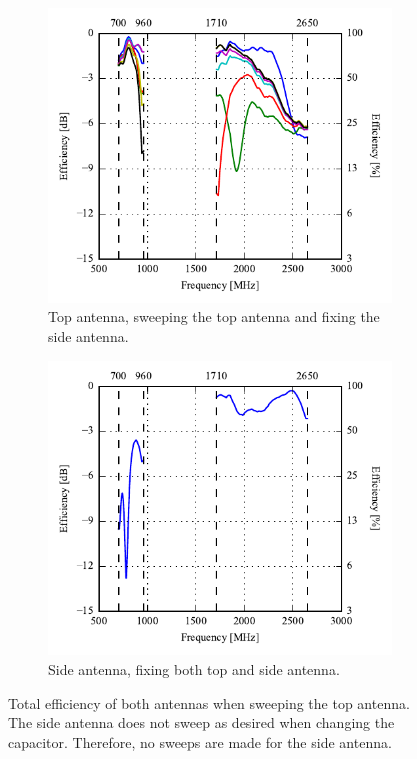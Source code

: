 \begin{figure}[htbp]
    \centering
    \begin{subfigure}{0.49\linewidth}
        \includegraphics{img/tech_sol/nonresonant/prototype/efficiency_top.pdf}
        \caption{Top antenna, sweeping the top antenna and fixing the side antenna.}
    \end{subfigure}
    \hfill
    \begin{subfigure}{0.49\linewidth}
        \includegraphics{img/tech_sol/nonresonant/prototype/efficiency_side.pdf}
        \caption{Side antenna, fixing both top and side antenna.}
    \end{subfigure}
    \caption{Total efficiency of both antennas when sweeping the top antenna. The side antenna does not sweep as desired when changing the capacitor. Therefore, no sweeps are made for the side antenna.}
    \label{fig:nonresonant_proto_sweep_efficiency}
\end{figure}
